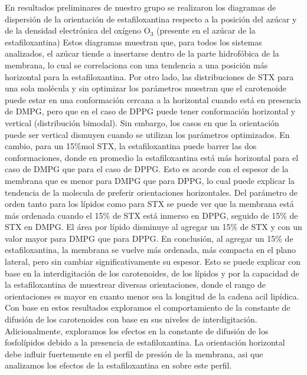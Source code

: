 En resultados preliminares de nuestro grupo se realizaron los diagramas de dispersi\'{o}n de la orientaci\'{o}n de estafiloxantina respecto a la posici\'{o}n del az\'{u}car y de la densidad electr\'{o}nica del ox\'{i}geno $\mathrm{O}_3$ (presente en el az\'{u}car de la estafiloxantina) Estos diagramas muestran que, para todos los sistemas analizados, el az\'{u}car tiende a insertarse dentro de la parte hidrof\'{o}bica de la membrana, lo cual se correlaciona con una tendencia a una posici\'{o}n m\'{a}s horizontal para la estafiloxantina. Por otro lado, las distribuciones de STX para una sola mol\'{e}cula y sin optimizar los par\'{a}metros muestran que el carotenoide puede estar en una conformaci\'{o}n cercana a la horizontal cuando est\'{a} en presencia de DMPG, pero que en el caso de DPPG puede tener conformaci\'{o}n horizontal y vertical (distribuci\'{o}n bimodal). Sin embargo, los casos en que la orientaci\'{o}n puede ser vertical dismuyen cuando se utilizan los par\'{a}metros optimizados. En cambio, para un 15\%mol STX, la estafiloxantina puede barrer las dos conformaciones, donde en promedio la estafiloxantina est\'{a} m\'{a}s horizontal para el caso de DMPG que para el caso de DPPG. Esto es acorde con el espesor de la membrana que es menor para DMPG que para DPPG, lo cual puede explicar la tendencia de la molecula de preferir orientaciones horizontales. Del par\'{a}metro de orden tanto para los l\'{i}pidos como para STX se puede ver que la membrana est\'{a} m\'{a}s ordenada cuando el 15\% de STX est\'{a} inmerso en DPPG, seguido de 15\% de STX en DMPG. El \'{a}rea por l\'{i}pido disminuye al agregar un 15\% de STX y con un valor mayor para DMPG que para DPPG. En conclusi\'{o}n, al agregar un 15\% de estafiloxantina, la membrana se vuelve m\'{a}s ordenada, m\'{a}s compacta en el plano lateral, pero sin cambiar significativamente su espesor. Esto se puede explicar con base en la interdigitaci\'{o}n de los carotenoides, de los l\'{i}pidos y por la capacidad de la estafiloxantina de muestrear diversas orientaciones, donde el rango de orientaciones es mayor en cuanto menor sea la longitud de la cadena acil lip\'{i}dica. Con base en estos resultados exploramos el comportamiento de la constante de difusi\'{o}n de los carotenoides con base en sus niveles de interdigitaci\'{o}n. Adicionalmente, exploramos los efectos en la constante de difusi\'{o}n de los fosfol\'{i}pidos debido a la presencia de estafiloxantina. La orientaci\'{o}n horizontal debe influir fuertemente en el perfil de presi\'{o}n de la membrana, asi que analizamos los efectos de la estafiloxantina en sobre este perfil.\\[4.0cm]
